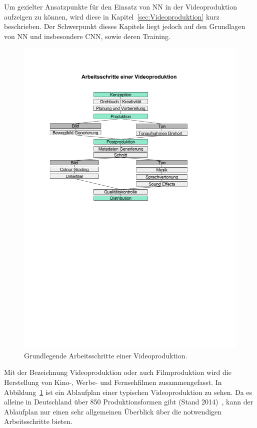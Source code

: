 \documentclass[times, 11pt,twocolumn]{article}
\begin{document}
 \label{sec:Grundlagen}
Um gezielter Ansatzpunkte für den Einsatz von NN in der Videoproduktion aufzeigen zu können, wird diese in Kapitel~\ref{sec:Videoproduktion} kurz beschrieben. Der Schwerpunkt dieses Kapitels liegt jedoch auf den Grundlagen von NN und insbesondere CNN, sowie deren Training.

 \label{sec:Videoproduktion} 
\begin{figure}
	\flushleft
	\includegraphics[width=\columnwidth, trim = 20mm 145mm 45mm 40mm, clip]{Bilder/ArbeitsschritteVideoproduktion.pdf}
	\caption{Grundlegende Arbeitsschritte einer Videoproduktion.}
	\label{fig:Videoproduktion}
\end{figure}
Mit der Bezeichnung Videoproduktion oder auch Filmproduktion wird die Herstellung von Kino-, Werbe- und Fernsehfilmen zusammengefasst. In Abbildung~\ref{fig:Videoproduktion} ist ein Ablaufplan einer typischen Videoproduktion zu sehen. Da es alleine in Deutschland über 850 Produktionsformen gibt (Stand 2014)~\cite{formatt}, kann der Ablaufplan nur einen sehr allgemeinen Überblick über die notwendigen Arbeitsschritte bieten. \\
\end{document}
